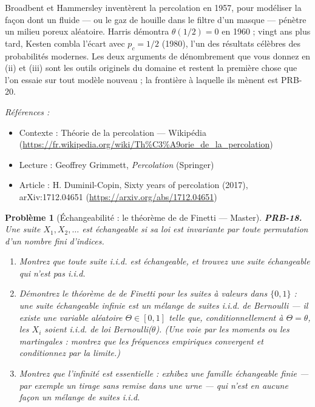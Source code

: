 \documentclass[11pt]{article}
\newtheorem{problem}{Problème}
\newenvironment{refs}{\par\small\noindent\emph{Références :}\begin{itemize}\setlength\itemsep{0pt}}{\end{itemize}\normalsize}
\begin{document}
\noindent Broadbent et Hammersley inventèrent la percolation en 1957, pour modéliser la
façon dont un fluide --- ou le gaz de houille dans le filtre d'un masque --- pénètre un milieu poreux
aléatoire. Harris démontra $ \theta(1/2) = 0 $ en 1960 ; vingt ans plus tard, Kesten combla
l'écart avec $ p_c = 1/2 $ (1980), l'un des résultats célèbres des probabilités modernes. Les
deux arguments de dénombrement que vous donnez en (ii) et (iii) sont les outils originels du
domaine et restent la première chose que l'on essaie sur tout modèle nouveau ; la frontière à
laquelle ils mènent est PRB-20.

\begin{refs}
\item Contexte : Théorie de la percolation --- Wikipédia (\url{https://fr.wikipedia.org/wiki/Th%C3%A9orie_de_la_percolation})
\item Lecture : Geoffrey Grimmett, \textit{Percolation} (Springer)
\item Article : H. Duminil-Copin, \og{} Sixty years of percolation \fg{} (2017), arXiv:1712.04651 (\url{https://arxiv.org/abs/1712.04651})
\end{refs}

\bigskip

\begin{problem}[{Échangeabilité : le théorème de de Finetti --- Master}]
\textbf{PRB-18.} Une suite $ X_1, X_2, \dots $ est
\textit{échangeable} si sa loi est invariante par toute permutation d'un nombre fini d'indices.
\begin{enumerate}
\item[(i)] Montrez que toute suite i.i.d. est échangeable, et trouvez une suite échangeable qui n'est pas
i.i.d.
\item[(ii)] Démontrez le théorème de de Finetti pour les suites à valeurs dans $ \{0,1\} $ : une suite
échangeable infinie est un \textit{mélange} de suites i.i.d. de Bernoulli --- il existe une variable
aléatoire $ \Theta \in [0,1] $ telle que, conditionnellement à $ \Theta = \theta $, les
$ X_i $ soient i.i.d. de loi Bernoulli($ \theta $). (Une voie par les moments ou les
martingales : montrez que les fréquences empiriques convergent et conditionnez par la limite.)
\item[(iii)] Montrez que l'infinité est essentielle : exhibez une famille échangeable finie --- par exemple
un tirage sans remise dans une urne --- qui n'est en aucune façon un mélange de suites i.i.d.
\end{enumerate}

\end{problem}
\end{document}
